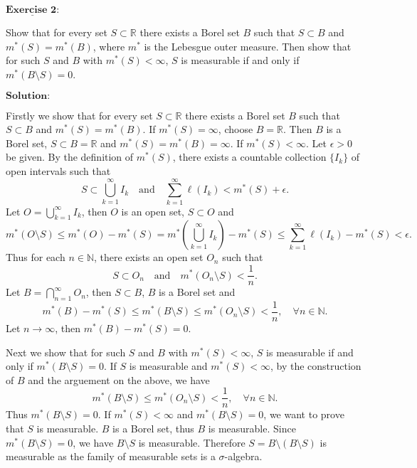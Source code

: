 \documentclass[12pt,a4paper]{ctexart}
\begin{document}
\newpage 

$\underline{\textbf{Exercise 2:}}$

Show that for every set $S \subset \mathbb R$ there exists a Borel set $B$ such that $S \subset B$ and $m^{*}(S) = m^{*}(B)$, where $m^*$ is the Lebesgue outer measure. Then show that for such $S$ and $B$ with $m^{*}(S) < \infty$, $S$ is measurable if and only if $m^{*} (B \setminus S) = 0$.

\vspace{8pt}
$\textbf{Solution:}$

Firstly we show that for every set $S \subset \mathbb R$ there exists a Borel set $B$ such that $S \subset B$ and $m^{*}(S) = m^{*}(B)$. If $m^{*}(S) = \infty$, choose $B = \mathbb R$. Then $B$ is a Borel set, $S \subset B = \mathbb R$ and $m^{*}(S) = m^{*}(B) = \infty$. If $m^{*}(S) < \infty$. Let $\epsilon > 0$ be given. By the definition of $m^{*}(S)$, there exists a countable collection $\{I_{k}\}$ of open intervals such that 
$$S \subset \bigcup_{k = 1}^{\infty} I_{k} \quad \text{and} \quad \sum_{k = 1}^{\infty} \ell(I_{k}) < m^{*}(S) + \epsilon.$$
Let $O = \bigcup_{k = 1}^{\infty} I_{k}$, then $O$ is an open set, $S \subset O$ and
$$m^{*}(O \setminus S) \leq m^{*}(O) - m^{*}(S) = m^{*}(\bigcup_{k = 1}^{\infty} I_{k}) - m^{*}(S) \leq \sum_{k = 1}^{\infty} \ell(I_{k}) - m^{*}(S) < \epsilon.$$
Thus for each $n \in \mathbb N$, there exists an open set $O_n$ such that
$$S \subset O_n \quad \text{and} \quad m^{*}(O_n \setminus S) < \frac{1}{n}.$$
Let $B = \bigcap_{n = 1}^{\infty} O_n$, then $S \subset B$, $B$ is a Borel set and
$$m^{*}(B) - m^{*}(S) \leq m^{*}(B \setminus S) \leq m^{*}(O_n \setminus S) < \frac{1}{n}, \quad \forall n \in \mathbb N.$$
Let $n \to \infty$, then $m^{*}(B) - m^{*}(S) = 0$.

Next we show that for such $S$ and $B$ with $m^{*}(S) < \infty$, $S$ is measurable if and only if $m^{*} (B \setminus S) = 0$. If $S$ is measurable and $m^{*}(S) < \infty$, by the construction of $B$ and the arguement on the above, we have
$$m^{*}(B \setminus S) \leq m^{*}(O_n \setminus S) < \frac{1}{n}, \quad \forall n \in \mathbb N.$$
Thus $m^{*}(B \setminus S) = 0$. If $m^{*}(S) < \infty$ and $m^{*} (B \setminus S) = 0$, we want to prove that $S$ is measurable. $B$ is a Borel set, thus $B$ is measurable. Since $m^{*} (B \setminus S) = 0$, we have $B \setminus S$ is measurable. Therefore $S = B \setminus (B \setminus S)$ is measurable as the family of measurable sets is a $\sigma$-algebra.
\end{document}
